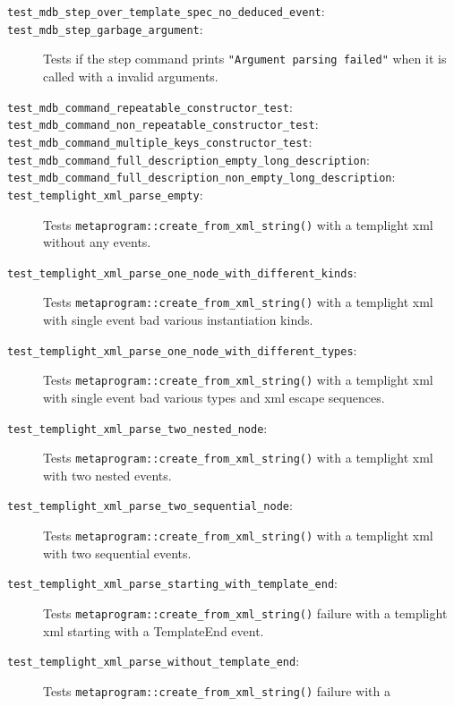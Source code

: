 \begin{description}
    \item[\texttt{test\_mdb\_step\_over\_template\_spec\_no\_deduced\_event}:]
    \item[\texttt{test\_mdb\_step\_garbage\_argument}:]
        Tests if the step command prints
        \texttt{"Argument parsing failed"} when it is called with a invalid
        arguments.
    \item[\texttt{test\_mdb\_command\_repeatable\_constructor\_test}:]
    \item[\texttt{test\_mdb\_command\_non\_repeatable\_constructor\_test}:]
    \item[\texttt{test\_mdb\_command\_multiple\_keys\_constructor\_test}:]
    \item[\texttt{test\_mdb\_command\_full\_description\_empty\_long\_description}:]
    \item[\texttt{test\_mdb\_command\_full\_description\_non\_empty\_long\_description}:]
    \item[\texttt{test\_templight\_xml\_parse\_empty}:]
        Tests \texttt{metaprogram::create\_from\_xml\_string()} with a templight
        xml without any events.
    \item[\texttt{test\_templight\_xml\_parse\_one\_node\_with\_different\_kinds}:]
        Tests \texttt{metaprogram::create\_from\_xml\_string()} with a templight
        xml with single event bad various instantiation kinds.
    \item[\texttt{test\_templight\_xml\_parse\_one\_node\_with\_different\_types}:]
        Tests \texttt{metaprogram::create\_from\_xml\_string()} with a templight
        xml with single event bad various types and xml escape sequences.
    \item[\texttt{test\_templight\_xml\_parse\_two\_nested\_node}:]
        Tests \texttt{metaprogram::create\_from\_xml\_string()} with a templight
        xml with two nested events.
    \item[\texttt{test\_templight\_xml\_parse\_two\_sequential\_node}:]
        Tests \texttt{metaprogram::create\_from\_xml\_string()} with a templight
        xml with two sequential events.
    \item[\texttt{test\_templight\_xml\_parse\_starting\_with\_template\_end}:]
        Tests \texttt{metaprogram::create\_from\_xml\_string()} failure with a
        templight xml starting with a TemplateEnd event.
    \item[\texttt{test\_templight\_xml\_parse\_without\_template\_end}:]
        Tests \texttt{metaprogram::create\_from\_xml\_string()} failure with a

\end{description}
